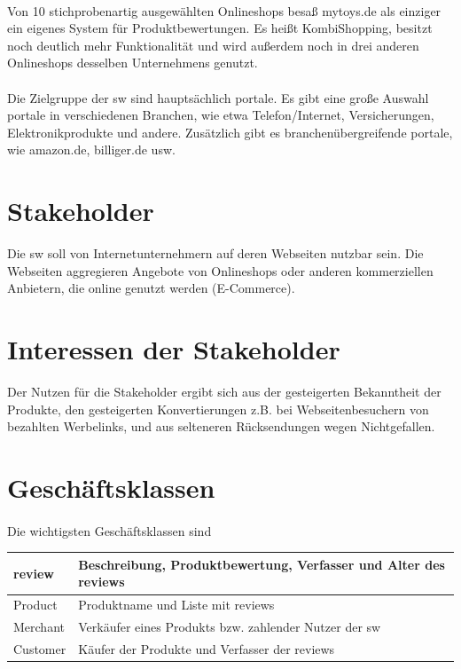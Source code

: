 \documentclass{article}
\begin{document}
\paragraph{}
Von 10 stichprobenartig ausgewählten Onlineshops besaß mytoys.de als einziger ein eigenes System für Produktbewertungen. Es heißt \glqq KombiShopping\grqq, besitzt noch deutlich mehr Funktionalität und wird außerdem noch in drei anderen Onlineshops desselben Unternehmens genutzt.

\paragraph{}
Die Zielgruppe der \gls{sw} sind hauptsächlich \gls{portal}e. Es gibt eine große Auswahl \gls{portal}e in verschiedenen Branchen, wie etwa Telefon/Internet, Versicherungen, Elektronikprodukte und andere. Zusätzlich gibt es branchenübergreifende \gls{portal}e, wie amazon.de, billiger.de usw.

\section{Stakeholder}
Die \gls{sw} soll von Internetunternehmern auf deren Webseiten nutzbar sein. Die Webseiten aggregieren Angebote von Onlineshops oder anderen kommerziellen Anbietern, die online genutzt werden (E-Commerce).

\section{Interessen der Stakeholder} Der Nutzen für die Stakeholder ergibt sich aus der gesteigerten Bekanntheit der Produkte, den gesteigerten Konvertierungen z.B. bei Webseitenbesuchern von bezahlten Werbelinks, und aus selteneren Rücksendungen wegen Nichtgefallen.

\section{Geschäftsklassen}
\paragraph{}
Die wichtigsten Geschäftsklassen sind \\

\begin{tabular}{|l|l|}
  \hline
  \gls{review} & Beschreibung, Produktbewertung, Verfasser und Alter des \gls{review}s \\
  \hline
  Product & Produktname und Liste mit \gls{review}s \\
  \hline
  Merchant & Verkäufer eines Produkts bzw. zahlender Nutzer der \gls{sw} \\
  \hline
  Customer & Käufer der Produkte und Verfasser der \gls{review}s \\
  \hline
\end{tabular}
\end{document}
